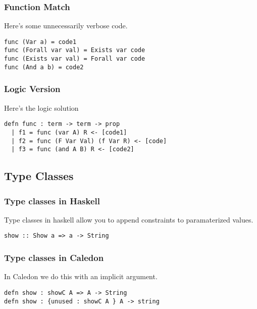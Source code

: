 \begin{frame}[fragile]
\frametitle{Function Match}

Here's some unnecessarily verbose code.

\begin{lstlisting}
func (Var a) = code1
func (Forall var val) = Exists var code
func (Exists var val) = Forall var code
func (And a b) = code2
\end{lstlisting}
\end{frame}


\begin{frame}[fragile]
\frametitle{Logic Version}

Here's the logic solution

\begin{lstlisting}
defn func : term -> term -> prop 
  | f1 = func (var A) R <- [code1]
  | f2 = func (F Var Val) (f Var R) <- [code]
  | f3 = func (and A B) R <- [code2]
\end{lstlisting}
\end{frame}

\subsection{Type Classes}

\begin{frame}[fragile]
\frametitle{Type classes in Haskell}

Type classes in haskell allow you to append constraints
to paramaterized values.

\begin{lstlisting}
show :: Show a => a -> String
\end{lstlisting}
\end{frame}


\begin{frame}[fragile]
\frametitle{Type classes in Caledon}

In Caledon we do this with an implicit argument.
\begin{lstlisting}
defn show : showC A => A -> String
defn show : {unused : showC A } A -> string
\end{lstlisting}
\end{frame}
